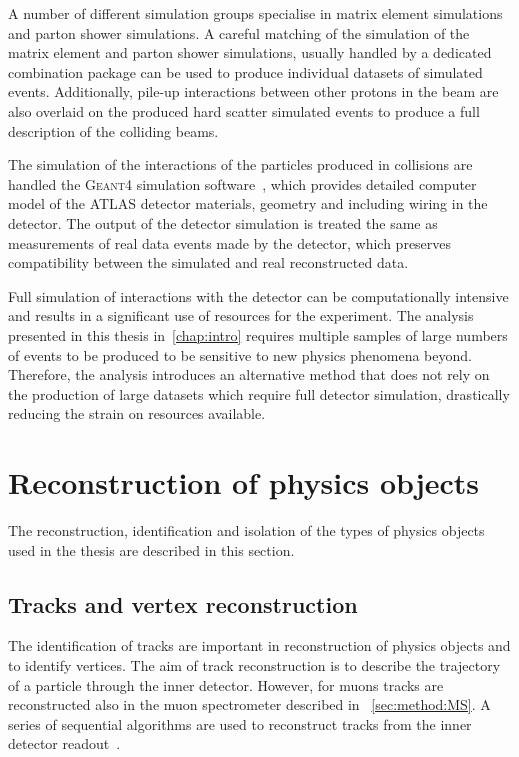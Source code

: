 A number of different simulation groups specialise in matrix element simulations and parton shower simulations. A careful matching of the simulation of the matrix element and parton shower simulations, usually handled by a dedicated combination package can be used to produce individual datasets of simulated events. Additionally, pile-up interactions between other protons in the beam are also overlaid on the produced hard scatter simulated events to produce a full description of the colliding beams. 

The simulation of the interactions of the particles produced in collisions are handled the \textsc{Geant4} simulation software~\cite{Geant1,Geant2,Geant3}, which provides detailed computer model of the ATLAS detector materials, geometry and including wiring in the detector. The output of the detector simulation is treated the same as measurements of real data events made by the detector, which preserves compatibility between the simulated and real reconstructed data. 

Full simulation of interactions with the detector can be computationally intensive and results in a significant use of resources for the experiment. The analysis presented in this thesis in~\cref{chap:intro} requires multiple samples of large numbers of events to be produced to be sensitive to new physics phenomena beyond. Therefore, the analysis introduces an alternative method that does not rely on the production of large datasets which require full detector simulation, drastically reducing the strain on resources available. 

\section{Reconstruction of physics objects}\label{sec:reconstruction}
The reconstruction, identification and isolation of the types of physics objects used in the thesis are described in this section. 

\subsection{Tracks and vertex reconstruction}\label{sec:reconstruction:tracks}
The identification of tracks are important in reconstruction of physics objects and to identify vertices. The aim of track reconstruction is to describe the trajectory of a particle through the inner detector. However, for muons tracks are reconstructed also in the muon spectrometer described in ~\cref{sec:method:MS}. A series of sequential algorithms are used to reconstruct tracks from the inner detector readout~\cite{ATLAS:tracking}. 

